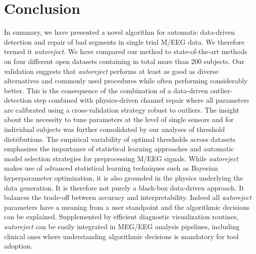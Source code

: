 \section{Conclusion}

In summary, we have presented a novel algorithm for automatic data-driven detection and repair of bad segments in single trial M/EEG data. We therefore termed it \emph{autoreject}. We have compared our method to state-of-the-art methods on four different open datasets containing in total more than 200 subjects. Our validation suggests that \emph{autoreject} performs at least as good as diverse alternatives and commonly used procedures while often performing considerably better. This is the consequence of the combination of a data-driven outlier-detection step combined with physics-driven channel repair where all parameters are calibrated using a cross-validation strategy robust to outliers. The insight about the necessity to tune parameters at the level of single sensors and for individual subjects was further consolidated by our analyses of threshold distributions. The empirical variability of optimal thresholds across datasets emphasizes the importance of statistical learning approaches and automatic model selection strategies for preprocessing M/EEG signals. While \emph{autoreject} makes use of advanced statistical learning techniques such as Bayesian hyperparameter optimization, it is also grounded in the physics underlying the data generation. It is therefore not purely a black-box data-driven approach. It balances the trade-off between accuracy and interpretability. Indeed all \emph{autoreject} parameters have a meaning from a user standpoint and the algorithmic decisions can be explained. Supplemented by efficient diagnostic visualization routines, \emph{autoreject} can be easily integrated in MEG/EEG analysis pipelines,
including clinical ones where understanding algorithmic decisions is mandatory for tool adoption.

